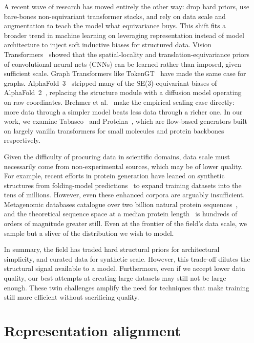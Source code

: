 \documentclass[12pt,a4paper,twoside]{report}
\begin{document}
A recent wave of research has moved entirely the other way: drop hard priors, use bare-bones non-equivariant transformer stacks, and rely on data scale and augmentation to teach the model what equivariance buys. This shift fits a broader trend in machine learning on leveraging representation instead of model architecture to inject soft inductive biases for structured data. Vision Transformers~\cite{ViT} showed that the spatial-locality and translation-equivariance priors of convolutional neural nets (CNNs) can be learned rather than imposed, given sufficient scale. Graph Transformers like TokenGT~\cite{TokenGT} have made the same case for graphs. AlphaFold~3~\cite{AlphaFold3} stripped many of the SE(3)-equivariant biases of AlphaFold~2~\cite{AlphaFold2}, replacing the structure module with a diffusion model operating on raw coordinates. Brehmer et al.~\cite{Brehmer2024} make the empirical scaling case directly: more data through a simpler model beats less data through a richer one. In our work, we examine Tabasco~\cite{Tabasco} and Proteina~\cite{Proteina}, which are flow-based generators built on largely vanilla transformers for small molecules and protein backbones respectively.

Given the difficulty of procuring data in scientific domains, data scale must necessarily come from non-experimental sources, which may be of lower quality. For example, recent efforts in protein generation have leaned on synthetic structures from folding-model predictions~\cite{Proteina,AFDB} to expand training datasets into the tens of millions. However, even these enhanced corpora are arguably insufficient. Metagenomic databases catalogue over two billion natural protein sequences~\cite{MGnify}, and the theoretical sequence space at a median protein length~\cite{BrocchieriKarlin} is hundreds of orders of magnitude greater still. Even at the frontier of the field's data scale, we sample but a sliver of the distribution we wish to model.

In summary, the field has traded hard structural priors for architectural simplicity, and curated data for synthetic scale. However, this trade-off dilutes the structural signal available to a model. Furthermore, even if we accept lower data quality, our best attempts at creating large datasets may still not be large enough. These twin challenges amplify the need for techniques that make training still more efficient without sacrificing quality.

\section{Representation alignment}
\end{document}
